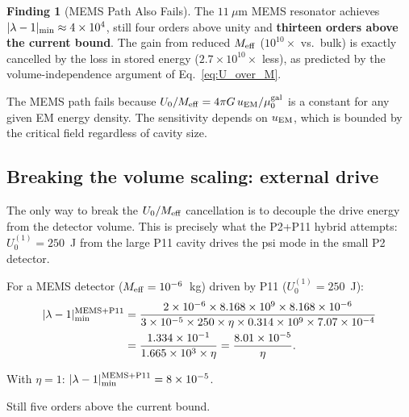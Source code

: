 \documentclass[11pt,twocolumn]{article}
\newcommand{\lam}{\lambda}
\newcommand{\Meff}{M_{\rm eff}}
\newcommand{\ee}[1]{\times 10^{#1}}
\newcommand{\muG}{\mu_0^{\rm gal}}
\theoremstyle{definition}
\newtheorem{finding}[theorem]{Finding}
\theoremstyle{remark}
\begin{document}
\begin{finding}[MEMS Path Also Fails]
\label{find:mems_fails}
The $11~\mu$m MEMS resonator achieves $|\lam-1|_{\rm min} \approx 4\ee{4}$,
still four orders above unity and \textbf{thirteen orders above the current
bound}. The gain from reduced $\Meff$ ($10^{10}\times$ vs.\ bulk) is
exactly cancelled by the loss in stored energy ($2.7\ee{10}\times$ less),
as predicted by the volume-independence argument of Eq.~\eqref{eq:U_over_M}.

The MEMS path fails because $U_0/\Meff = 4\pi G\,u_{\rm EM}/\muG$
is a constant for any given EM energy density. The sensitivity depends
on $u_{\rm EM}$, which is bounded by the critical field regardless of
cavity size.
\end{finding}

\subsection{Breaking the volume scaling: external drive}
\label{sec:external_drive}

The only way to break the $U_0/\Meff$ cancellation is to decouple the
drive energy from the detector volume. This is precisely what the
P2+P11 hybrid attempts: $U_0^{(1)} = 250$~J from the large P11 cavity
drives the psi mode in the small P2 detector.

For a MEMS detector ($\Meff = 10^{-6}$~kg) driven by P11 ($U_0^{(1)} = 250$~J):
\begin{align}
|\lam-1|_{\rm min}^{\rm MEMS+P11}
&= \frac{2\times 10^{-6}\times 8.168\ee{9}\times 8.168\times 10^{-6}}
{3\ee{-5}\times 250\times \eta\times 0.314\times 10^9\times 7.07\ee{-4}}
\nonumber\\
&= \frac{1.334\ee{-1}}{1.665\ee{3}\times\eta}
= \frac{8.01\ee{-5}}{\eta}.
\label{eq:MEMS_P11}
\end{align}

With $\eta = 1$: $|\lam-1|_{\rm min}^{\rm MEMS+P11} = 8\ee{-5}$.

Still five orders above the current bound.
\end{document}
